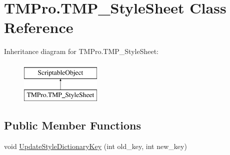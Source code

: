 \hypertarget{class_t_m_pro_1_1_t_m_p___style_sheet}{}\section{T\+M\+Pro.\+T\+M\+P\+\_\+\+Style\+Sheet Class Reference}
\label{class_t_m_pro_1_1_t_m_p___style_sheet}
Inheritance diagram for T\+M\+Pro.\+T\+M\+P\+\_\+\+Style\+Sheet\+:\begin{figure}[H]
\begin{center}
\leavevmode
\includegraphics[height=2.000000cm]{class_t_m_pro_1_1_t_m_p___style_sheet}
\end{center}
\end{figure}
\subsection*{Public Member Functions}
\begin{DoxyCompactItemize}
\item 
void \mbox{\hyperlink{class_t_m_pro_1_1_t_m_p___style_sheet_af80d7de5e502d36e00ccfe5f281ed3cb}{Update\+Style\+Dictionary\+Key}} (int old\+\_\+key, int new\+\_\+key)
\end{DoxyCompactItemize}
